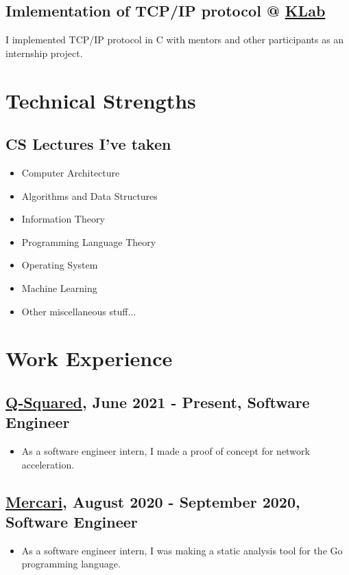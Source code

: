 \documentclass{article}
\begin{document}
  \subsection*{Imlementation of TCP/IP protocol @ \href{https://www.klab.com/en/}{KLab}}
    I implemented TCP/IP protocol in C with mentors and other participants as an internship project.

\section*{Technical Strengths}
  \subsection*{CS Lectures I've taken}
    \begin{itemize}
      \item Computer Architecture
      \item Algorithms and Data Structures
      \item Information Theory
      \item Programming Language Theory
      \item Operating System
      \item Machine Learning
      \item Other miscellaneous stuff...
    \end{itemize}

\section*{Work Experience}
  \subsection*{\href{https://q-squared.jp}{Q-Squared}, June 2021 - Present, Software Engineer}
    \begin{itemize}
      \item As a software engineer intern, I made a proof of concept for network acceleration.
    \end{itemize}

  \subsection*{\href{https://about.mercari.com/en}{Mercari}, August 2020 - September 2020, Software Engineer}
    \begin{itemize}
      \item As a software engineer intern, I was making a static analysis tool for the Go programming language.
    \end{itemize}
\end{document}
